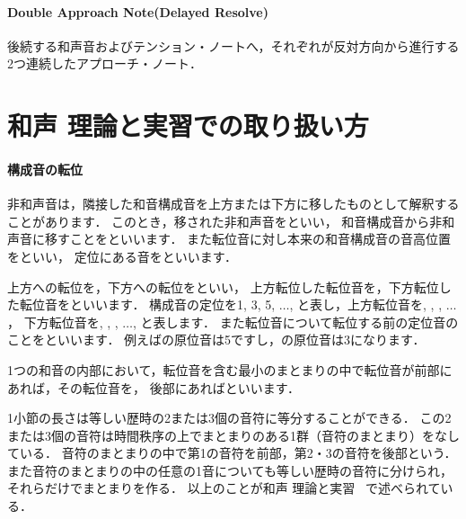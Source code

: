 \documentclass[dvipdfmx,uplatex,b5paper,openany,jbase=12Q,nomag*,textwidth-limit=44%
               ]{gachimuchi}[2020/05/05]
\begin{document}
\paragraph{Double Approach Note(Delayed Resolve)}
後続する和声音およびテンション・ノートへ，それぞれが反対方向から進行する2つ連続したアプローチ・ノート．
\begin{Music}
  \nostartrule%
  \Startpiece%
  \znotes%
  \en\NOtes
  \en\Notes
  \zchordsu{\Cross}\zchordsu{\Cross}%
  \en\NOTes%
  \en\doublebar
  \Notes
  \ds{}\zchordsu{\Cross}\zchordsu{\Cross}%
  \en\NOTes%
  \en\doublebar
  \NOtes
  \en\Notes
  \zchordsu{\Cross}\zchordsu{\Cross}%
  \en\NOTes%
  \en\setdoublebar
  \endpiece%
\end{Music}



\section{和声 理論と実習での取り扱い方}
\paragraph{構成音の転位}
非和声音は，隣接した和音構成音を上方または下方に移したものとして解釈することがあります．
このとき，移された非和声音をといい，
和音構成音から非和声音に移すことをといいます\cite[p.111]{chSHIMAOKA1iii}．
また転位音に対し本来の和音構成音の音高位置をといい，
定位にある音をといいます．

上方への転位を，下方への転位をといい，
上方転位した転位音を，下方転位した転位音をといいます．
構成音の定位を1, 3, 5, $\ldots$, と表し，上方転位音を, , , $\ldots$，
下方転位音を, , , $\ldots$, と表します．
また転位音について転位する前の定位音のことをといいます．
例えばの原位音は5ですし，の原位音は3になります．

1つの和音の内部において，転位音を含む最小のまとまりの中で転位音が前部にあれば，その転位音を，
後部にあればといいます．

\begin{chuui}
1小節の長さは等しい歴時の2または3個の音符に等分することができる．
この2または3個の音符は時間秩序の上でまとまりのある1群（音符のまとまり）をなしている．
音符のまとまりの中で第1の音符を前部，第2・3の音符を後部という．
また音符のまとまりの中の任意の1音についても等しい歴時の音符に分けられ，それらだけでまとまりを作る．
以上のことが和声 理論と実習 \Gniii~\cite{chSHIMAOKA1iii}で述べられている．
\end{chuui}
\end{document}
